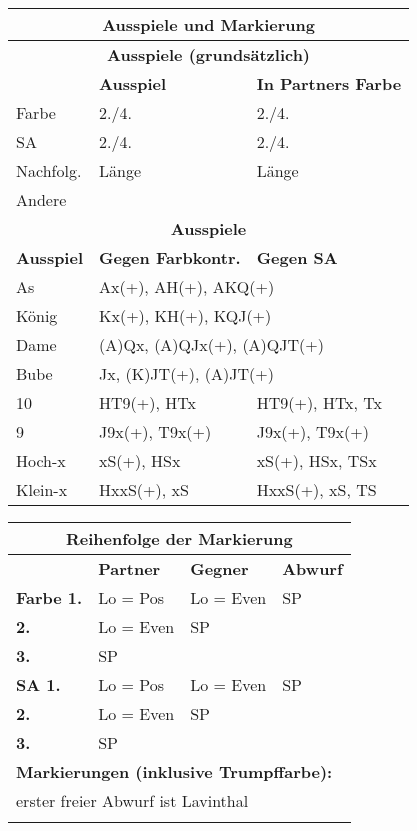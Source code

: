 \documentclass{article}
\begin{document}
\begin{multicols}{3}
\begin{tabularx}{\columnwidth}{|l|X|X|}
\hline \multicolumn{3}{|c|}{\bf \large Ausspiele und Markierung} \\

\hline \multicolumn{3}{|c|}{\bf Ausspiele (grundsätzlich)} \\
\hline           & {\bf Ausspiel} & {\bf In Partners Farbe} \\
\hline Farbe     & 2./4. & 2./4. \\
\hline SA        & 2./4. & 2./4. \\
\hline Nachfolg. & Länge & Länge \\
\hline Andere    & \multicolumn{2}{|l|}{} \\

\hline \multicolumn{3}{|c|}{\bf Ausspiele} \\
\hline {\bf Ausspiel} & {\bf Gegen Farbkontr.} & {\bf Gegen SA} \\
\hline As       & \multicolumn{2}{l|}{Ax(+), AH(+), AKQ(+)} \\
\hline König    & \multicolumn{2}{l|}{Kx(+), KH(+), KQJ(+) } \\
\hline Dame     & \multicolumn{2}{l|}{(A)Qx, (A)QJx(+), (A)QJT(+)} \\
\hline Bube     & \multicolumn{2}{l|}{Jx, (K)JT(+), (A)JT(+)} \\
\hline 10       & HT9(+), HTx & HT9(+), HTx, Tx \\
\hline 9        & J9x(+), T9x(+) & J9x(+), T9x(+) \\
\hline Hoch-x   & xS(+), HSx & xS(+), HSx, TSx \\
\hline Klein-x  & HxxS(+), xS & HxxS(+), xS, TS \\
\hline \end{tabularx}

\begin{tabularx}{\columnwidth}{|l|X|X|X|}
 \multicolumn{4}{|c|}{\bf Reihenfolge der Markierung} \\
\hline                & {\bf Partner} & {\bf Gegner} & {\bf Abwurf} \\
\hline \bf Farbe \hfill 1. & Lo = Pos  & Lo = Even & SP \\
\hline \bf       \hfill 2. & Lo = Even & SP        & \\
\hline \bf       \hfill 3. & SP        &           & \\
\hline \bf SA    \hfill 1. & Lo = Pos  & Lo = Even & SP \\
\hline \bf       \hfill 2. & Lo = Even & SP        & \\
\hline \bf       \hfill 3. & SP        &           & \\
\hline \multicolumn{4}{|l|}{\bf Markierungen (inklusive Trumpffarbe):} \\
       \multicolumn{4}{|l|}{erster freier Abwurf ist Lavinthal} \\
       \multicolumn{4}{|l|}{} \\
\hline
\end{tabularx}


\end{multicols}
\end{document}

